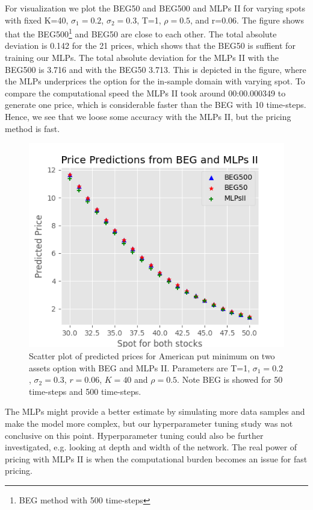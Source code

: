 For visualization we plot the BEG50 and BEG500 and MLPs II for varying spots with fixed K=40, $\sigma_1=0.2$, $\sigma_2=0.3$, T=1, $\rho=0.5$,  and r=0.06. The figure shows that the BEG500\footnote{BEG method with 500 time-steps} and BEG50 are close to each other. The total absolute deviation is 0.142 for the 21 prices, which shows that the BEG50 is suffient for training our MLPs. The total absolute deviation for the MLPs II with the BEG500 is 3.716 and with the BEG50 3.713. This is depicted in the figure, where the MLPs underprices the option for the in-sample domain with varying spot. To compare the computational speed the MLPs II took around 00:00.000349 to generate one price, which is considerable faster than the BEG with 10 time-steps. Hence, we see that we loose some accuracy with the MLPs II, but the pricing method is fast. 

\begin{figure}[H]
\centering
\includegraphics{Figures/compareBEGMLPsII.png}
\decoRule
\caption[Compare BEG and MLPs II]{Scatter plot of predicted prices for American put minimum on two assets option with BEG and MLPs II. Parameters are T=1, $\sigma_1=0.2$, $\sigma_2=0.3$, $r=0.06$, $K=40$ and $\rho=0.5$. Note BEG is showed for 50 time-steps and 500 time-steps.}
\label{fig:histLSMMLPsI}
\end{figure}

The MLPs might provide a better estimate by simulating more data samples and make the model more complex, but our hyperparameter tuning study was not conclusive on this point. Hyperparameter tuning could also be further investigated, e.g. looking at depth and width of the network. The real power of pricing with MLPs II is when the computational burden becomes an issue for fast pricing. 

